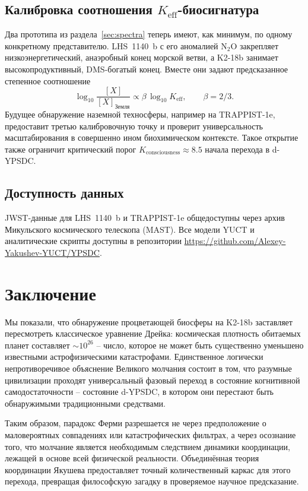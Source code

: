 \documentclass[11pt,a4paper]{article}
\begin{document}
	\subsection{Калибровка соотношения \(K_{\mathrm{eff}}\)-биосигнатура}
	Два прототипа из раздела~\ref{sec:spectra} теперь имеют, как минимум, по одному конкретному представителю. LHS~1140~b с его аномалией N$_2$O закрепляет низкоэнергетический, анаэробный конец морской ветви, а K2-18b занимает высокопродуктивный, DMS-богатый конец. Вместе они задают предсказанное степенное соотношение
	\begin{equation}
		\log_{10} \frac{[X]}{[X]_{\mathrm{Земля}}} \propto \beta\,\log_{10} K_{\mathrm{eff}} ,\qquad \beta=2/3 .
	\end{equation}
	Будущее обнаружение наземной техносферы, например на TRAPPIST-1e, предоставит третью калибровочную точку и проверит универсальность масштабирования в совершенно ином биохимическом контексте. Такое открытие также ограничит критический порог \(K_{\mathrm{consciousness}}\approx 8.5\) начала перехода в d-YPSDC.
	
	\subsection*{Доступность данных}
	JWST-данные для LHS~1140~b и TRAPPIST-1e общедоступны через архив Микульского космического телескопа (MAST). Все модели YUCT и аналитические скрипты доступны в репозитории \url{https://github.com/Alexey-Yakushev-YUCT/YPSDC}.
	
	\section{Заключение}
	\label{sec:conclusions}
	Мы показали, что обнаружение процветающей биосферы на K2-18b заставляет пересмотреть классическое уравнение Дрейка: космическая плотность обитаемых планет составляет \(\sim 10^{26}\) – число, которое не может быть существенно уменьшено известными астрофизическими катастрофами. Единственное логически непротиворечивое объяснение Великого молчания состоит в том, что разумные цивилизации проходят универсальный фазовый переход в состояние когнитивной самодостаточности – состояние d-YPSDC, в котором они перестают быть обнаружимыми традиционными средствами.
	
	Таким образом, парадокс Ферми разрешается не через предположение о маловероятных совпадениях или катастрофических фильтрах, а через осознание того, что молчание является необходимым следствием динамики координации, лежащей в основе всей физической реальности. Объединённая теория координации Якушева предоставляет точный количественный каркас для этого перехода, превращая философскую загадку в проверяемое научное предсказание.
	
\end{document}

